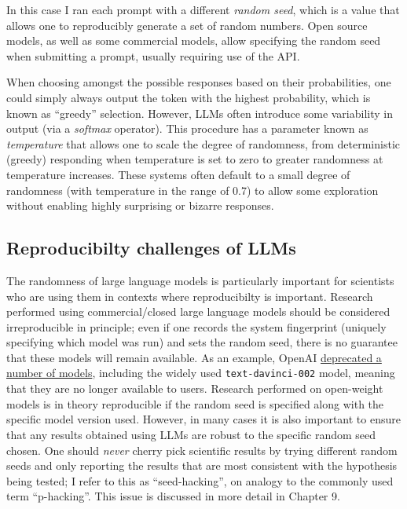 In this case I ran each prompt with a different \textit{random seed}, which is a value that allows one to reproducibly generate a set of random numbers.
Open source models, as well as some commercial models, allow specifying the random seed when submitting a prompt, usually requiring use of the API.

When choosing amongst the possible responses based on their probabilities, one could simply always output the token with the highest probability, which is known as ``greedy'' selection.
However, LLMs often introduce some variability in output (via a \textit{softmax} operator).
This procedure has a parameter known as \textit{temperature} that allows one to scale the degree of randomness, from deterministic (greedy) responding when temperature is set to zero to greater randomness at temperature increases.
These systems often default to a small degree of randomness (with temperature in the range of 0.7) to allow some exploration without enabling highly surprising or bizarre responses.

\subsection{Reproducibilty challenges of LLMs}

The randomness of large language models is particularly important for scientists who are using them in contexts where reproducibilty is important.
Research performed using commercial/closed large language models should be considered irreproducible in principle; even if one records the system fingerprint (uniquely specifying which model was run) and sets the random seed, there is no guarantee that these models will remain available.
As an example, OpenAI \href{https://platform.openai.com/docs/deprecations}{deprecated a number of models}, including the widely used \texttt{text-davinci-002} model, meaning that they are no longer available to users.
Research performed on open-weight models is in theory reproducible if the random seed is specified along with the specific model version used.
However, in many cases it is also important to ensure that any results obtained using LLMs are robust to the specific random seed chosen.
One should \textit{never} cherry pick scientific results by trying different random seeds and only reporting the results that are most consistent with the hypothesis being tested; I refer to this as ``seed-hacking'', on analogy to the commonly used term ``p-hacking''.
This issue is discussed in more detail in Chapter 9.
